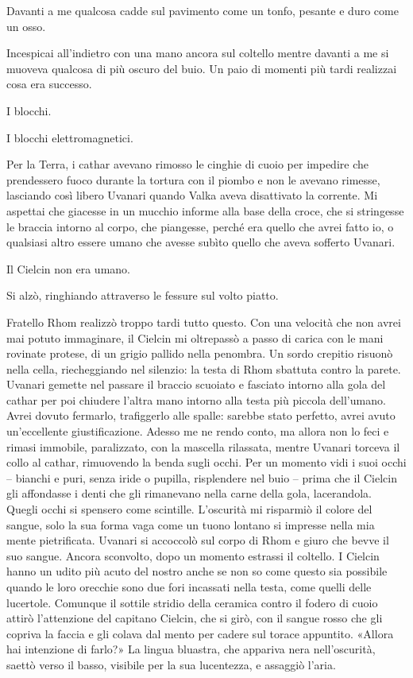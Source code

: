 Davanti a me qualcosa cadde sul pavimento come un tonfo, pesante e duro
come un osso.

Incespicai all'indietro con una mano ancora sul coltello mentre davanti
a me si muoveva qualcosa di più oscuro del buio. Un paio di momenti più
tardi realizzai cosa era successo.

I blocchi.

I blocchi elettromagnetici.

Per la Terra, i cathar avevano rimosso le cinghie di cuoio per impedire
che prendessero fuoco durante la tortura con il piombo e non le avevano
rimesse, lasciando così libero Uvanari quando Valka aveva disattivato la
corrente. Mi aspettai che giacesse in un mucchio informe alla base della
croce, che si stringesse le braccia intorno al corpo, che piangesse,
perché era quello che avrei fatto io, o qualsiasi altro essere umano che
avesse subìto quello che aveva sofferto Uvanari.

Il Cielcin non era umano.

Si alzò, ringhiando attraverso le fessure sul volto piatto.

Fratello Rhom realizzò troppo tardi tutto questo. Con una velocità che
non avrei mai potuto immaginare, il Cielcin mi oltrepassò a passo di
carica con le mani rovinate protese, di un grigio pallido nella
penombra. Un sordo crepitio risuonò nella cella, riecheggiando nel
silenzio: la testa di Rhom sbattuta contro la parete. Uvanari gemette
nel passare il braccio scuoiato e fasciato intorno alla gola del cathar
per poi chiudere l'altra mano intorno alla testa più piccola dell'umano.
Avrei dovuto fermarlo, trafiggerlo alle spalle: sarebbe stato perfetto,
avrei avuto un'eccellente giustificazione. Adesso me ne rendo conto, ma
allora non lo feci e rimasi immobile, paralizzato, con la mascella
rilassata, mentre Uvanari torceva il collo al cathar, rimuovendo la
benda sugli occhi. Per un momento vidi i suoi occhi -- bianchi e puri,
senza iride o pupilla, risplendere nel buio -- prima che il Cielcin gli
affondasse i denti che gli rimanevano nella carne della gola,
lacerandola. Quegli occhi si spensero come scintille. L'oscurità mi
risparmiò il colore del sangue, solo la sua forma vaga come un tuono
lontano si impresse nella mia mente pietrificata. Uvanari si accoccolò
sul corpo di Rhom e giuro che bevve il suo sangue. Ancora sconvolto,
dopo un momento estrassi il coltello. I Cielcin hanno un udito più acuto
del nostro anche se non so come questo sia possibile quando le loro
orecchie sono due fori incassati nella testa, come quelli delle
lucertole. Comunque il sottile stridio della ceramica contro il fodero
di cuoio attirò l'attenzione del capitano Cielcin, che si girò, con il
sangue rosso che gli copriva la faccia e gli colava dal mento per cadere
sul torace appuntito. «Allora hai intenzione di farlo?» La lingua
bluastra, che appariva nera nell'oscurità, saettò verso il basso,
visibile per la sua lucentezza, e assaggiò l'aria.


